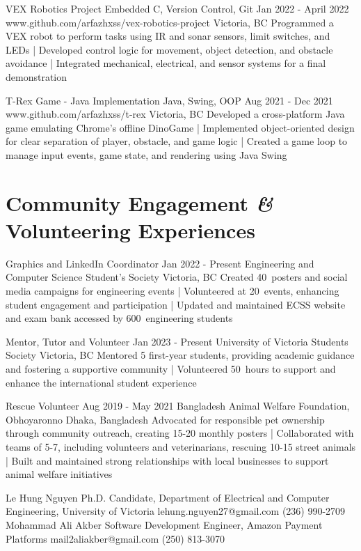 \documentclass[a4paper,10pt]{article}
\begin{document}
\projectentry
{VEX Robotics Project}
{Embedded C, Version Control, Git}
{Jan 2022 - April 2022}
{www.github.com/arfazhxss/vex-robotics-project}
{Victoria, BC}
{Programmed a VEX robot to perform tasks using IR and sonar sensors, limit switches, and LEDs 
| Developed control logic for movement, object detection, and obstacle avoidance 
| Integrated mechanical, electrical, and sensor systems for a final demonstration 
}

\projectentry
{T-Rex Game - Java Implementation}
{Java, Swing, OOP}
{Aug 2021 - Dec 2021}
{www.github.com/arfazhxss/t-rex}
{Victoria, BC}
{Developed a cross-platform Java game emulating Chrome's offline DinoGame 
| Implemented object-oriented design for clear separation of player, obstacle, and game logic 
| Created a game loop to manage input events, game state, and rendering using Java Swing 
}

\section{Community Engagement \textit{\&} Volunteering Experiences}

\volunteeringexperiences
{Graphics and LinkedIn Coordinator}
{Jan 2022 - Present}
{Engineering and Computer Science Student's Society}
{Victoria, BC}
{Created 40\plus\ posters and social media campaigns for engineering events 
| Volunteered at 20\plus\ events, enhancing student engagement and participation 
| Updated and maintained ECSS website and exam bank accessed by 600\plus\ engineering students
}

\volunteeringexperiences
{Mentor, Tutor and Volunteer}
{Jan 2023 - Present}
{University of Victoria Students Society}
{Victoria, BC}
{Mentored 5 first-year students, providing academic guidance and fostering a supportive community
| Volunteered 50\plus\ hours to support and enhance the international student experience 
}

\volunteeringexperiences
{Rescue Volunteer}
{Aug 2019 - May 2021}
{Bangladesh Animal Welfare Foundation, Obhoyaronno}
{Dhaka, Bangladesh}
{Advocated for responsible pet ownership through community outreach, creating 15-20 monthly posters 
| Collaborated with teams of 5-7, including volunteers and veterinarians, rescuing 10-15 street animals 
| Built and maintained strong relationships with local businesses to support animal welfare initiatives
}

\begin{references}
        {Le Hung Nguyen}
        {Ph.D. Candidate, Department of Electrical and}
        {Computer Engineering, University of Victoria}
        {lehung.nguyen27@gmail.com}
        {(236) 990-2709}
    \hfill
        {Mohammad Ali Akber}
        {Software Development Engineer,}
        {Amazon Payment Platforms}
        {mail2aliakber@gmail.com}
        {(250) 813-3070}
\end{references}
\end{document}

